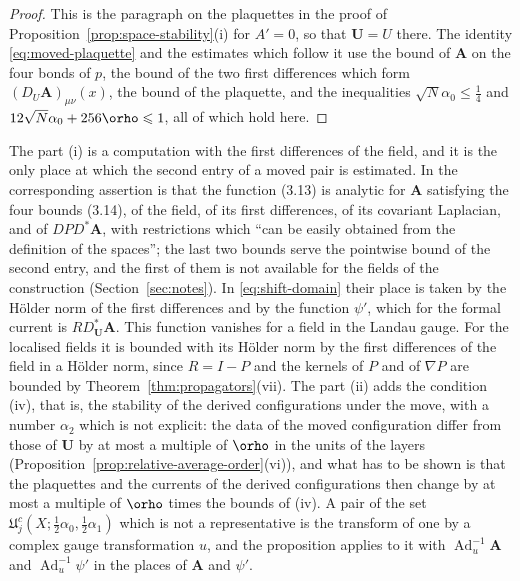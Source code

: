 \documentclass[11pt]{preprint}
\let\rho\orho
\newcommand{\Ad}{\operatorname{Ad}}
\numberwithin{equation}{section}
\begin{document}
\begin{proof}
This is the paragraph on the plaquettes in the proof of Proposition~\ref{prop:space-stability}(i) for $A' = 0$, so that $\mathbf U = U$ there. The identity \eqref{eq:moved-plaquette} and the estimates which follow it use the bound of $\mathbf A$ on the four bonds of $p$, the bound of the two first differences which form $(D_U\mathbf A)_{\mu\nu}(x)$, the bound of the plaquette, and the inequalities $\sqrt N\alpha_0 \leqslant \frac{1}{4}$ and $12\sqrt N\alpha_0 + 256\rho \leqslant 1$, all of which hold here.
\end{proof}

The part (i) is a computation with the first differences of the field, and it is the only place at which the second entry of a moved pair is estimated. In \cite[p.~272]{BalabanRG1} the corresponding assertion is that the function (3.13) is analytic for $\mathbf A$ satisfying the four bounds (3.14), of the field, of its first differences, of its covariant Laplacian, and of $DPD^*\mathbf A$, with restrictions which ``can be easily obtained from the definition of the spaces''; the last two bounds serve the pointwise bound of the second entry, and the first of them is not available for the fields of the construction (Section~\ref{sec:notes}). In \eqref{eq:shift-domain} their place is taken by the H\"older norm of the first differences and by the function $\psi'$, which for the formal current is $RD^*_{\mathbf U}\mathbf A$. This function vanishes for a field in the Landau gauge. For the localised fields it is bounded with its H\"older norm by the first differences of the field in a H\"older norm, since $R = I - P$ and the kernels of $P$ and of $\nabla P$ are bounded by Theorem~\ref{thm:propagators}(vii). The part (ii) adds the condition (iv), that is, the stability of the derived configurations under the move, with a number $\alpha_2$ which is not explicit: the data of the moved configuration differ from those of $\mathbf U$ by at most a multiple of $\rho$ in the units of the layers (Proposition~\ref{prop:relative-average-order}(vi)), and what has to be shown is that the plaquettes and the currents of the derived configurations then change by at most a multiple of $\rho$ times the bounds of (iv). A pair of the set $\mathfrak U^c_j(X; \frac{1}{2}\alpha_0, \frac{1}{2}\alpha_1)$ which is not a representative is the transform of one by a complex gauge transformation $u$, and the proposition applies to it with $\Ad_u^{-1}\mathbf A$ and $\Ad_u^{-1}\psi'$ in the places of $\mathbf A$ and $\psi'$.
\end{document}
